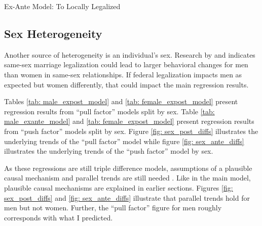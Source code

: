 \documentclass[12pt,letterpaper]{article}
\begin{document}
\begin{table}[p]
    \centering
    \caption{Ex-Ante Model: To Locally Legalized}
    \label{tab: tlocal_exante_model}
    
\end{table}


\clearpage
\subsection{Sex Heterogeneity}

Another source of heterogeneity is an individual’s sex. Research by \citet{1} and \citet{12} indicates same-sex marriage legalization could lead to larger behavioral changes for men than women in same-sex relationships. If federal legalization impacts men as expected but women differently, that could impact the main regression results.

Tables \ref{tab: male_expost_model} and \ref{tab: female_expost_model} present regression results from “pull factor” models split by sex. Table \ref{tab: male_exante_model} and \ref{tab: female_expost_model} present regression results from “push factor” models split by sex. Figure \ref{fig: sex_post_diffs} illustrates the underlying trends of the “pull factor” model while figure \ref{fig: sex_ante_diffs} illustrates the underlying trends of the “push factor” model by sex.

As these regressions are still triple difference models, assumptions of a plausible causal mechanism and parallel trends are still needed \citep{24, 25}. Like in the main model, plausible causal mechanisms are explained in earlier sections. Figures \ref{fig: sex_post_diffs} and \ref{fig: sex_ante_diffs} illustrate that parallel trends hold for men but not women. Further, the “pull factor” figure for men roughly corresponds with what I predicted.
\end{document}
